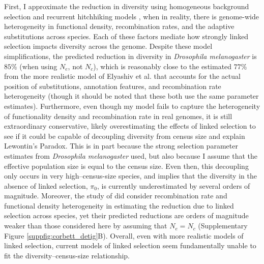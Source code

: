 \documentclass[11pt]{article}
\begin{document}
First, I approximate the reduction in diversity using homogeneous background
selection and recurrent hitchhiking models
\parencite{Kaplan1989-sc,Hudson1995-xc,Coop2012-cd}, when in reality, there is
genome-wide heterogeneity in functional density, recombination rates, and the
adaptive substitutions across species. Each of these factors mediate how
strongly linked selection impacts diversity across the genome. Despite these
model simplifications, the predicted reduction in diversity in \emph{Drosophila
melanogaster} is $85\%$ (when using $N_e$, not $N_c$), which is reasonably
close to the estimated $77\%$ from the more realistic model of Elyashiv et al.
that accounts for the actual position of substitutions, annotation features,
and recombination rate heterogeneity (though it should be noted that these both
use the same parameter estimates). Furthermore, even though my model fails to
capture the heterogeneity of functionality density and recombination rate in
real genomes, it is still extraordinary conservative, likely overestimating the
effects of linked selection to see if it could be capable of decoupling
diversity from census size and explain Lewontin's Paradox. This is in part
because the strong selection parameter estimates from \emph{Drosophila
melanogaster} used, but also because I assume that the effective population
size is equal to the census size.  Even then, this decoupling only occurs in
very high--census-size species, and implies that the diversity in the absence
of linked selection, $\pi_0$, is currently underestimated by several orders of
magnitude. Moreover, the study of \textcite{Corbett-Detig2015-gt} did consider
recombination rate and functional density heterogeneity in estimating the
reduction due to linked selection across species, yet their predicted
reductions are orders of magnitude weaker than those considered here by
assuming that $N_e = N_c$ (Supplementary Figure \ref{suppfig:corbett_detig}B).
Overall, even with more realistic models of linked selection, current models of
linked selection seem fundamentally unable to fit the diversity--census-size
relationship.
\end{document}
